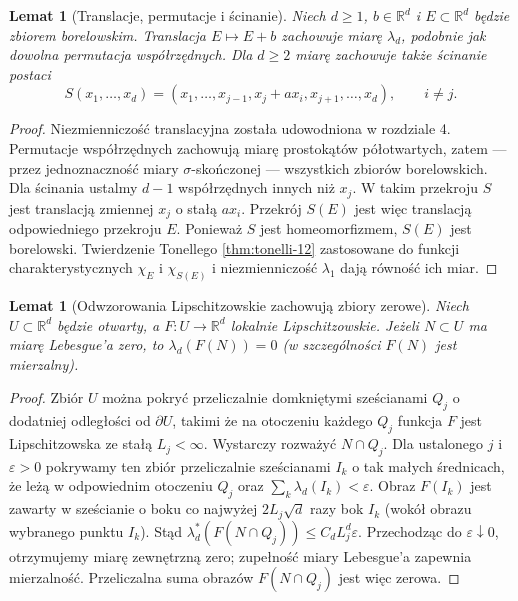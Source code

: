 \documentclass[11pt,a4paper,oneside]{book}
\numberwithin{equation}{chapter}
\theoremstyle{plain}
\newtheorem{lemat}[twierdzenie]{Lemat}
\theoremstyle{definition}
\theoremstyle{remark}
\begin{document}
\begin{lemat}[Translacje, permutacje i ścinanie]
\label{lem:shear-13}
Niech $d\ge1$, $b\in\mathbb R^d$ i $E\subset\mathbb R^d$
będzie zbiorem borelowskim. Translacja $E\mapsto E+b$ zachowuje
miarę $\lambda_d$, podobnie jak dowolna permutacja współrzędnych.
Dla $d\ge2$ miarę zachowuje także ścinanie postaci
\[
S(x_1,\ldots,x_d)=(x_1,\ldots,x_{j-1},
 x_j+a x_i,x_{j+1},\ldots,x_d),\qquad i\ne j.
\]
\end{lemat}
\begin{proof}
Niezmienniczość translacyjna została udowodniona w rozdziale 4.
Permutacje współrzędnych zachowują miarę prostokątów
półotwartych, zatem — przez jednoznaczność miary
$\sigma$-skończonej — wszystkich zbiorów borelowskich.
Dla ścinania ustalmy $d-1$ współrzędnych innych niż $x_j$.
W takim przekroju $S$ jest translacją zmiennej $x_j$
o stałą $a x_i$. Przekrój $S(E)$ jest więc translacją
odpowiedniego przekroju $E$. Ponieważ $S$ jest homeomorfizmem,
$S(E)$ jest borelowski. Twierdzenie Tonellego
\ref{thm:tonelli-12} zastosowane do funkcji charakterystycznych $\chi_E$ i $\chi_{S(E)}$
i niezmienniczość $\lambda_1$ dają równość ich miar.
\end{proof}

\begin{lemat}[Odwzorowania Lipschitzowskie zachowują zbiory zerowe]
\label{lem:lipschitz-null-13}
Niech $U\subset\mathbb R^d$ będzie otwarty, a
$F:U\to\mathbb R^d$ lokalnie Lipschitzowskie.
Jeżeli $N\subset U$ ma miarę Lebesgue'a zero, to
$\lambda_d(F(N))=0$ (w szczególności $F(N)$ jest mierzalny).
\end{lemat}
\begin{proof}
Zbiór $U$ można pokryć przeliczalnie domkniętymi sześcianami
$Q_j$ o dodatniej odległości od $\partial U$, takimi że
na otoczeniu każdego $Q_j$ funkcja $F$ jest Lipschitzowska
ze stałą $L_j<\infty$. Wystarczy rozważyć $N\cap Q_j$.
Dla ustalonego $j$ i $\varepsilon>0$ pokrywamy ten zbiór
przeliczalnie sześcianami $I_k$ o tak małych średnicach,
że leżą w odpowiednim otoczeniu $Q_j$ oraz
$\sum_k\lambda_d(I_k)<\varepsilon$.
Obraz $F(I_k)$ jest zawarty w sześcianie o boku
co najwyżej $2L_j\sqrt d$ razy bok $I_k$ (wokół
obrazu wybranego punktu $I_k$). Stąd
$\lambda_d^*(F(N\cap Q_j))\le C_d L_j^d\varepsilon$.
Przechodząc do $\varepsilon\downarrow0$, otrzymujemy
miarę zewnętrzną zero; zupełność miary Lebesgue'a
zapewnia mierzalność. Przeliczalna suma obrazów
$F(N\cap Q_j)$ jest więc zerowa.
\end{proof}
\end{document}
